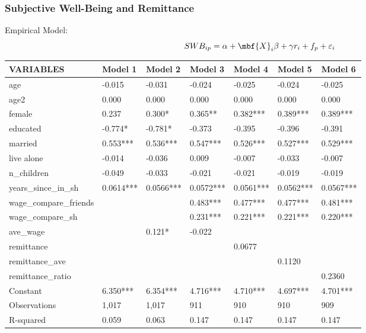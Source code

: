 \documentclass[10pt]{beamer}
\begin{document}
\begin{frame}[c]\frametitle{Subjective Well-Being and Remittance}
Empirical Model:
\begin{equation}
    SWB_{ip} = \alpha + \mbf{X}_{i}\beta + \gamma r_{i} + f_{p} + \varepsilon_{i}
\end{equation}
\begin{table}[htbp]
\scriptsize
  \centering
    \begin{tabular}{lllllll}
    \toprule
    VARIABLES & Model 1 & Model 2 & Model 3 & Model 4 & Model 5 & Model 6 \\
    \midrule
    age   & -0.015 & -0.031 & -0.024 & -0.025 & -0.024 & -0.025 \\
    age2  & 0.000 & 0.000 & 0.000 & 0.000 & 0.000 & 0.000 \\
    female & 0.237 & 0.300* & 0.365** & 0.382*** & 0.389*** & 0.389*** \\
    educated & -0.774* & -0.781* & -0.373 & -0.395 & -0.396 & -0.391 \\
    married & 0.553*** & 0.536*** & 0.547*** & 0.526*** & 0.527*** & 0.529*** \\
    live alone & -0.014 & -0.036 & 0.009 & -0.007 & -0.033 & -0.007 \\
    n\_children & -0.049 & -0.033 & -0.021 & -0.021 & -0.019 & -0.019 \\
    years\_since\_in\_sh & 0.0614*** & 0.0566*** & 0.0572*** & 0.0561*** & 0.0562*** & 0.0567*** \\
    wage\_compare\_friends &       &       & 0.483*** & 0.477*** & 0.477*** & 0.481*** \\
    wage\_compare\_sh &       &       & 0.231*** & 0.221*** & 0.221*** & 0.220*** \\
    ave\_wage &       & 0.121* & -0.022 &       &       &  \\
    remittance &       &       &       & 0.0677 &       &  \\
    remittance\_ave &       &       &       &       & 0.1120 &  \\
    remittance\_ratio &       &       &       &       &       & 0.2360 \\
    Constant & 6.350*** & 6.354*** & 4.716*** & 4.710*** & 4.697*** & 4.701*** \\
    Observations & 1,017 & 1,017 & 911   & 910   & 910   & 909 \\
    R-squared & 0.059 & 0.063 & 0.147 & 0.147 & 0.147 & 0.147 \\
    \bottomrule
    \end{tabular}%
  \label{tab:addlabel}%
\end{table}%


\end{frame}
\end{document}
